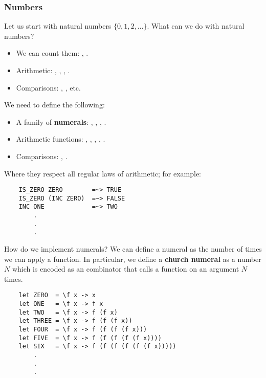 \documentclass[letterpaper]{article}
\begin{document}
\subsubsection{Numbers}
Let us start with natural numbers $\{0, 1, 2, \dots\}$. What can we do with natural numbers? 
\begin{itemize}
    \item We can count them: , . 
    \item Arithmetic: , \code{+}, \code{-}, \code{*}.
    \item Comparisons: \code{==}, \code{<=}, etc. 
\end{itemize}
We need to define the following: 
\begin{itemize}
    \item A family of \textbf{numerals}: , , , .
    \item Arithmetic functions: , , , , .
    \item Comparisons: , .
\end{itemize}
Where they respect all regular laws of arithmetic; for example: 
\begin{verbatim}
    IS_ZERO ZERO        =~> TRUE 
    IS_ZERO (INC ZERO)  =~> FALSE 
    INC ONE             =~> TWO 
        .
        . 
        .
\end{verbatim}
How do we implement numerals? We can define a numeral as the number of times we can apply a function. In particular, we define a \textbf{church numeral} as a number $N$ which is encoded as an combinator that calls a function on an argument $N$ times. 
\begin{verbatim}
    let ZERO  = \f x -> x
    let ONE   = \f x -> f x
    let TWO   = \f x -> f (f x)
    let THREE = \f x -> f (f (f x))
    let FOUR  = \f x -> f (f (f (f x)))
    let FIVE  = \f x -> f (f (f (f (f x))))
    let SIX   = \f x -> f (f (f (f (f (f x)))))
        .
        .
        .
\end{verbatim} 
\end{document}
